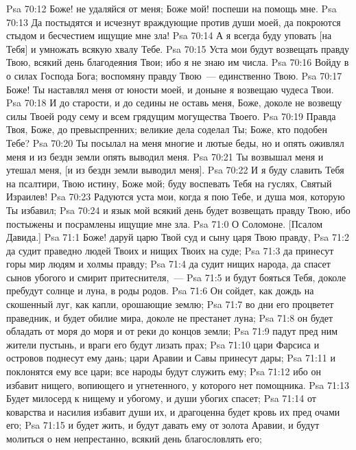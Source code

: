 \vs Psa 70:12 Боже! не удаляйся от меня; Боже мой! поспеши на помощь мне.
\vs Psa 70:13 Да постыдятся и исчезнут враждующие против души моей, да покроются стыдом и бесчестием ищущие мне зла!
\vs Psa 70:14 А я всегда буду уповать [на Тебя] и умножать всякую хвалу Тебе.
\vs Psa 70:15 Уста мои будут возвещать правду Твою, всякий день благодеяния Твои; ибо я не знаю им числа.
\vs Psa 70:16 Войду в  о силах Господа Бога; воспомяну правду Твою~--- единственно Твою.
\vs Psa 70:17 Боже! Ты наставлял меня от юности моей, и доныне я возвещаю чудеса Твои.
\vs Psa 70:18 И до старости, и до седины не оставь меня, Боже, доколе не возвещу силы Твоей роду сему и всем грядущим могущества Твоего.
\vs Psa 70:19 Правда Твоя, Боже, до превыспренних; великие дела соделал Ты; Боже, кто подобен Тебе?
\vs Psa 70:20 Ты посылал на меня многие и лютые беды, но и опять оживлял меня и из бездн земли опять выводил меня.
\vs Psa 70:21 Ты возвышал меня и утешал меня, [и из бездн земли выводил меня].
\vs Psa 70:22 И я буду славить Тебя на псалтири, Твою истину, Боже мой; буду воспевать Тебя на гуслях, Святый Израилев!
\vs Psa 70:23 Радуются уста мои, когда я пою Тебе, и душа моя, которую Ты избавил;
\vs Psa 70:24 и язык мой всякий день будет возвещать правду Твою, ибо постыжены и посрамлены ищущие мне зла.
\vs Psa 71:0 О Соломоне. [Псалом Давида.]
\rsbpar\vs Psa 71:1 Боже! даруй царю Твой суд и сыну царя Твою правду,
\vs Psa 71:2 да судит праведно людей Твоих и нищих Твоих на суде;
\vs Psa 71:3 да принесут горы мир людям и холмы правду;
\vs Psa 71:4 да судит нищих народа, да спасет сынов убогого и смирит притеснителя,~---
\vs Psa 71:5 и будут бояться Тебя, доколе пребудут солнце и луна, в роды родов.
\vs Psa 71:6 Он сойдет, как дождь на скошенный луг, как капли, орошающие землю;
\vs Psa 71:7 во дни его процветет праведник, и будет обилие мира, доколе не престанет луна;
\vs Psa 71:8 он будет обладать от моря до моря и от реки до концов земли;
\vs Psa 71:9 падут пред ним жители пустынь, и враги его будут лизать прах;
\vs Psa 71:10 цари Фарсиса и островов поднесут ему дань; цари Аравии и Савы принесут дары;
\vs Psa 71:11 и поклонятся ему все цари; все народы будут служить ему;
\vs Psa 71:12 ибо он избавит нищего, вопиющего и угнетенного, у которого нет помощника.
\vs Psa 71:13 Будет милосерд к нищему и убогому, и души убогих спасет;
\vs Psa 71:14 от коварства и насилия избавит души их, и драгоценна будет кровь их пред очами его;
\vs Psa 71:15 и будет жить, и будут давать ему от золота Аравии, и будут молиться о нем непрестанно, всякий день благословлять его;
